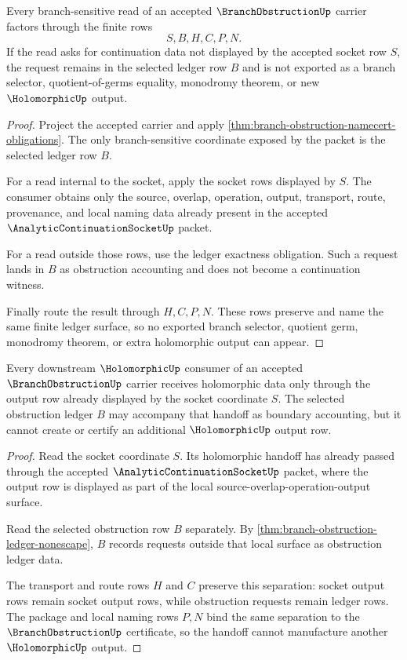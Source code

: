 \begin{theorem}
\label{thm:branch-obstruction-ledger-nonescape}
Every branch-sensitive read of an accepted $\BranchObstructionUp$ carrier factors through the finite rows
$$
S,B,H,C,P,N.
$$
If the read asks for continuation data not displayed by the accepted socket row $S$, the request remains in the selected ledger row $B$ and is not exported as a branch selector, quotient-of-germs equality, monodromy theorem, or new $\HolomorphicUp$ output.
\end{theorem}
\begin{proof}
Project the accepted carrier and apply \autoref{thm:branch-obstruction-namecert-obligations}. The only branch-sensitive coordinate exposed by the packet is the selected ledger row $B$.

For a read internal to the socket, apply the socket rows displayed by $S$. The consumer obtains only the source, overlap, operation, output, transport, route, provenance, and local naming data already present in the accepted $\AnalyticContinuationSocketUp$ packet.

For a read outside those rows, use the ledger exactness obligation. Such a request lands in $B$ as obstruction accounting and does not become a continuation witness.

Finally route the result through $H,C,P,N$. These rows preserve and name the same finite ledger surface, so no exported branch selector, quotient germ, monodromy theorem, or extra holomorphic output can appear.
\end{proof}

\begin{theorem}
\label{thm:branch-obstruction-holomorphic-handoff-boundary}
Every downstream $\HolomorphicUp$ consumer of an accepted $\BranchObstructionUp$ carrier receives holomorphic data only through the output row already displayed by the socket coordinate $S$. The selected obstruction ledger $B$ may accompany that handoff as boundary accounting, but it cannot create or certify an additional $\HolomorphicUp$ output row.
\end{theorem}
\begin{proof}
Read the socket coordinate $S$. Its holomorphic handoff has already passed through the accepted $\AnalyticContinuationSocketUp$ packet, where the output row is displayed as part of the local source-overlap-operation-output surface.

Read the selected obstruction row $B$ separately. By \autoref{thm:branch-obstruction-ledger-nonescape}, $B$ records requests outside that local surface as obstruction ledger data.

The transport and route rows $H$ and $C$ preserve this separation: socket output rows remain socket output rows, while obstruction requests remain ledger rows. The package and local naming rows $P,N$ bind the same separation to the $\BranchObstructionUp$ certificate, so the handoff cannot manufacture another $\HolomorphicUp$ output.
\end{proof}

